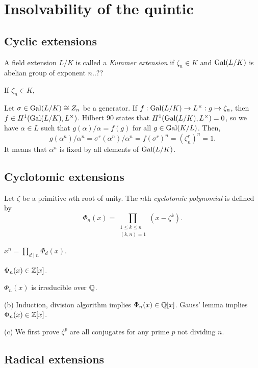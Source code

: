 \documentclass{../../large}
\begin{document}
\chapter{Insolvability of the quintic}


\section{Cyclic extensions}



\begin{prb}
A field extension $L/K$ is called a \emph{Kummer extension} if $\zeta_n\in K$ and $\operatorname{Gal}(L/K)$ is abelian group of exponent $n$..??
\begin{parts}
\item If $\zeta_n\in K$, 
\end{parts}
\end{prb}
Let $\sigma\in\operatorname{Gal}(L/K)\cong Z_n$ be a generator.
If $f:\operatorname{Gal}(L/K)\to L^\times:g\mapsto\zeta_n$, then $f\in H^1(\operatorname{Gal}(L/K),L^\times)$.
Hilbert 90 states that $H^1(\operatorname{Gal}(L/K),L^\times)=0$, so we have $\alpha\in L$ such that $g(\alpha)/\alpha=f(g)$ for all $g\in\operatorname{Gal}(K/L)$.
Then,
\[g(\alpha^n)/\alpha^n=\sigma^r(\alpha^n)/\alpha^n=f(\sigma^r)^n=(\zeta_n^r)^n=1.\]
It means that $\alpha^n$ is fixed by all elements of $\operatorname{Gal}(L/K)$.


\section{Cyclotomic extensions}

\begin{prb}
Let $\zeta$ be a primitive $n$th root of unity.
The $n$th \emph{cyclotomic polynomial} is defined by
\[\Phi_n(x)=\prod_{\substack{1\le k\le n\\(k,n)=1}}(x-\zeta^k).\]
\begin{parts}
\item $x^n=\prod_{d\mid n}\Phi_d(x)$.
\item $\Phi_n(x)\in\mathbb{Z}[x]$.
\item $\Phi_n(x)$ is irreducible over $\mathbb{Q}$.
\end{parts}
\end{prb}
\begin{pf}

(b)
Induction, division algorithm implies $\Phi_n(x)\in\mathbb{Q}[x]$.
Gauss' lemma implies $\Phi_n(x)\in\mathbb{Z}[x]$.

(c)
We first prove $\zeta^p$ are all conjugates for any prime $p$ not dividing $n$.
\end{pf}

\begin{prb}

\end{prb}






\section{Radical extensions}
\end{document}
